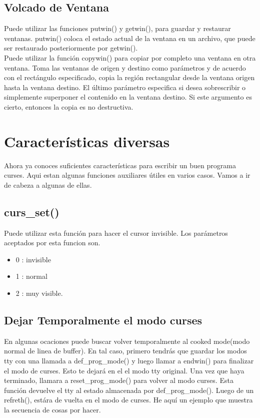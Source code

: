 \documentclass{article}
\begin{document}
\subsection{Volcado de Ventana}%
Puede utilizar las funciones putwin() y getwin(), para guardar y restaurar
ventanas. putwin() coloca el estado actual de la ventana en un archivo, que
puede ser restaurado posteriormente por getwin().\\

Puede utilizar la función copywin() para copiar por completo una ventana en
otra ventana. Toma las ventanas de origen y destino como parámetros y de
acuerdo con el rectángulo especificado, copia la región rectangular desde la
ventana origen hasta la ventana destino. El último parámetro especifica si
desea sobrescribir o simplemente superponer el contenido en la ventana destino.
Si este argumento es cierto, entonces la copia es no destructiva.

\section{Características diversas}%
Ahora ya conoces suficientes características para escribir un buen programa
curses. Aqui estan algunas funciones auxiliares útiles en varios casos. Vamos a
ir de cabeza a algunas de ellas.

\subsection{curs\_set()}%
Puede utilizar esta función para hacer el cursor invisible. Los parámetros
aceptados por esta funcion son.
\begin{itemize}
  \item 0 : invisible
  \item 1 : normal
  \item 2 : muy visible.
\end{itemize}

\subsection{Dejar Temporalmente el modo curses}%
En algunas ocaciones puede buscar volver temporalmente al cooked mode(modo
normal de linea de buffer). En tal caso, primero tendrás que guardar los modos
tty con una llamada a def\_prog\_mode() y luego llamar a endwin() para
finalizar el modo de curses. Esto te dejará en el el modo tty original. Una vez
que haya terminado, llamara a reset\_prog\_mode() para volver al modo curses.
Esta función devuelve el tty al estado almacenada por def\_prog\_mode(). Luego
de un refreth(), estára de vuelta en el modo de curses. He aquí un ejemplo que
muestra la secuencia de cosas por hacer.
\end{document}

